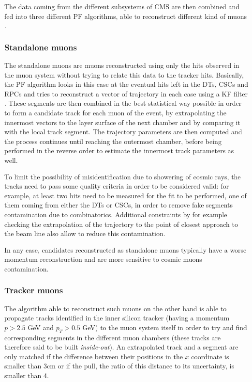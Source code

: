 \documentclass[a4paper, 10pt, openright]{report}
\begin{document}
The data coming from the different subsystems of \ac{CMS} are then combined and fed into three different \ac{PF} algorithms, able to reconstruct different kind of muons \cite{MuonSystemsEff}.

\subsubsection*{Standalone muons}
The standalone muons are muons reconstructed using only the hits observed in the muon system without trying to relate this data to the tracker hits. Basically, the \ac{PF} algorithm looks in this case at the eventual hits left in the \acp{DT}, \acp{CSC} and \acp{RPC} and tries to reconstruct a vector of trajectory in each case using a \ac{KF} filter \cite{KF}. These segments are then combined in the best statistical way possible in order to form a candidate track for each muon of the event, by extrapolating the innermost vectors to the layer surface of the next chamber and by comparing it with the local track segment. The trajectory parameters are then computed and the process continues until reaching the outermost chamber, before being performed in the reverse order to estimate the innermost track parameters as well.

To limit the possibility of misidentification due to showering of cosmic rays, the tracks need to pass some quality criteria in order to be considered valid: for example, at least two hits need to be measured for the fit to be performed, one of them coming from either the \acp{DT} or \acp{CSC}, in order to remove fake segments contamination due to combinatorics. Additional constraints by for example checking the extrapolation of the trajectory to the point of closest approach to the beam line also allow to reduce this contamination.

In any case, candidates reconstructed as standalone muons typically have a worse momentum reconstruction and are more sensitive to cosmic muons contamination.  

\subsubsection*{Tracker muons}
The algorithm able to reconstruct such muons on the other hand is able to propagate tracks identified in the inner silicon tracker (having a momentum $p > 2.5$ GeV and $p_T > 0.5$ GeV) to the muon system itself in order to try and find corresponding segments in the different muon chambers (these tracks are therefore said to be built \textit{inside-out}). An extrapolated track and a segment are only matched if the difference between their positions in the $x$ coordinate is smaller than 3cm or if the pull, the ratio of this distance to its uncertainty, is smaller than 4.
\end{document}
